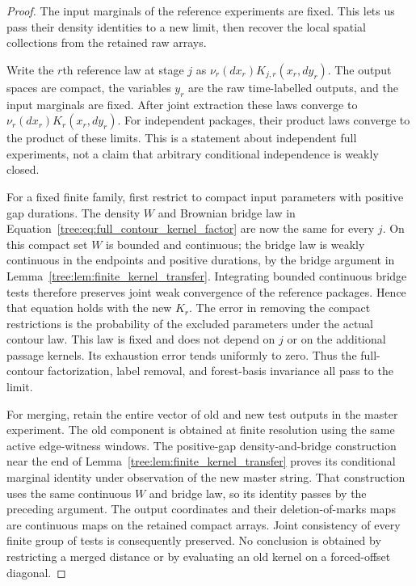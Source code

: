 \begin{proof}
The input marginals of the reference experiments are fixed. This lets
us pass their density identities to a new limit, then recover the local
spatial collections from the retained raw arrays.

Write the $r$th reference law at stage $j$ as
$\nu_r(dx_r)K_{j,r}(x_r,dy_r)$.  The output spaces are compact,
the variables $y_r$ are the raw time-labelled outputs, and the input
marginals are fixed.  After joint extraction these
laws converge to $\nu_r(dx_r)K_r(x_r,dy_r)$.  For independent
packages, their product laws converge to the product of these
limits.  This is a statement about independent full experiments,
not a claim that arbitrary conditional independence is weakly closed.

For a fixed finite family, first restrict to compact input parameters
with positive gap durations.  The density $W$ and Brownian bridge
law in Equation~\eqref{tree:eq:full_contour_kernel_factor} are now the
same for every $j$.  On this compact set $W$ is bounded and
continuous; the bridge law is weakly continuous in the endpoints
and positive durations, by the bridge argument in
Lemma~\ref{tree:lem:finite_kernel_transfer}.  Integrating bounded
continuous bridge tests therefore preserves joint weak convergence
of the reference packages.  Hence that equation holds with the
new $K_r$.  The error in removing the compact restrictions is the
probability of the excluded parameters under the actual contour
law.  This law is fixed and does not depend on $j$ or on the
additional passage kernels.  Its exhaustion error tends uniformly
to zero.  Thus the full-contour factorization, label removal, and
forest-basis invariance all pass to the limit.

For merging, retain the entire vector of old and new test outputs
in the master experiment.  The old component is obtained at finite
resolution using the same active edge-witness windows.  The
positive-gap density-and-bridge construction near the end of
Lemma~\ref{tree:lem:finite_kernel_transfer} proves its conditional
marginal identity under observation of the new master string.
That construction uses the same continuous $W$ and bridge law,
so its identity passes by the preceding argument.  The output
coordinates and their deletion-of-marks maps are continuous maps
on the retained compact arrays.  Joint consistency of every
finite group of tests is consequently preserved.  No conclusion
is obtained by restricting a merged distance or by evaluating an
old kernel on a forced-offset diagonal.


\end{proof}
